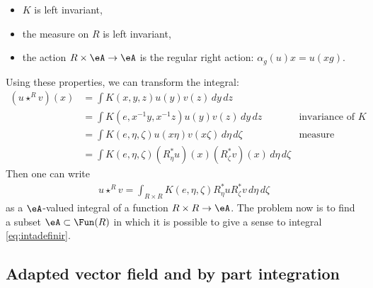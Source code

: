 \begin{itemize}
	\item $K$ is left invariant,
	\item the measure on $R$ is left invariant,
	\item the action $R\times\eA\to\eA$ is the regular right action: $\alpha_g(u)x=u(xg)$.
\end{itemize}
Using these properties, we can transform the integral:
\[
	\begin{aligned}
		(u\star^R v)(x) & =\int K(x,y,z)u(y)v(z)\,dy\,dz                                                                        \\
		                & =\int K(e,x^{-1}y,x^{-1}z)u(y)v(z)\,dy\,dz                              & \textrm{invariance of $K$}  \\
		                & =\int K(e,\eta,\zeta)u(x\eta)v(x\zeta)\,d\eta\,d\zeta                   & \textrm{measure invariance} \\
		                & =\int K(e,\eta,\zeta) (R^*_{\eta}u)(x) (R^*_{\zeta}v)(x)\,d\eta\,d\zeta
	\end{aligned}
\]
Then one can write
\begin{equation}  \label{eq:intadefinir}
	\begin{split}
		u\star^R v=\int_{R\times R} K(e,\eta,\zeta)R^*_{\eta}u R^*_{\zeta}v\,d\eta\,d\zeta
	\end{split}
\end{equation}
as a $\eA$-valued integral of a function $R\times R\to\eA$. The problem now is to find a subset $\eA\subset\Fun(R)$ in which it is possible to give a sense to integral \eqref{eq:intadefinir}.

\subsection{Adapted vector field and by part integration}

